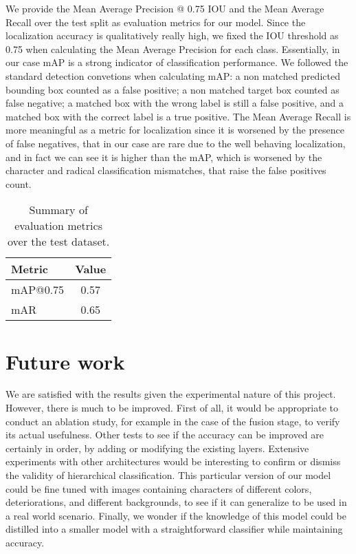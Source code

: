 We provide the Mean Average Precision @ 0.75 IOU and the Mean Average Recall over the test split as evaluation metrics for our model. Since the localization accuracy is qualitatively really high, we fixed the IOU threshold as 0.75 when calculating the Mean Average Precision for each class. Essentially, in our case mAP is a strong indicator of classification performance. We followed the standard detection convetions when calculating mAP: a non matched predicted bounding box counted as a false positive; a non matched target box counted as false negative; a matched box with the wrong label is still a false positive, and a matched box with the correct label is a true positive. The Mean Average Recall is more meaningful as a metric for localization since it is worsened by the presence of false negatives, that in our case are rare due to the well behaving localization, and in fact we can see it is higher than the mAP, which is worsened by the character and radical classification mismatches, that raise the false positives count.

\begin{table}
    \centering
    \begin{tabular}{|l|c|}
        \hline
        \textbf{Metric} & \textbf{Value} \\ \hline
        mAP@0.75        & 0.57           \\ \hline
        mAR             & 0.65           \\ \hline
    \end{tabular}
    \caption{Summary of evaluation metrics over the test dataset.}
    \label{tab:metrics}
\end{table}


\section{Future work}

We are satisfied with the results given the experimental nature of this project. However, there is much to be improved. First of all, it would be appropriate to conduct an ablation study, for example in the case of the fusion stage, to verify its actual usefulness. Other tests to see if the accuracy can be improved are certainly in order, by adding or modifying the existing layers. Extensive experiments with other architectures would be interesting to confirm or dismiss the validity of hierarchical classification. This particular version of our model could be fine tuned with images containing characters of different colors, deteriorations, and different backgrounds, to see if it can generalize to be used in a real world scenario. Finally, we wonder if the knowledge of this model could be distilled into a smaller model with a straightforward classifier while maintaining accuracy.


